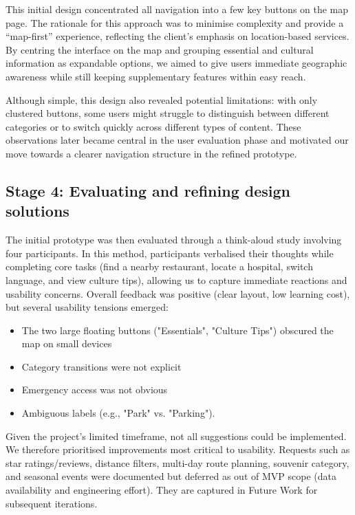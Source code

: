 This initial design concentrated all navigation into a few key buttons on the map page. The rationale for this approach was to minimise complexity and provide a “map-first” experience, reflecting the client’s emphasis on location-based services. By centring the interface on the map and grouping essential and cultural information as expandable options, we aimed to give users immediate geographic awareness while still keeping supplementary features within easy reach.  

Although simple, this design also revealed potential limitations: with only clustered buttons, some users might struggle to distinguish between different categories or to switch quickly across different types of content. These observations later became central in the user evaluation phase and motivated our move towards a clearer navigation structure in the refined prototype.

\subsection{Stage 4: Evaluating and refining design solutions}
The initial prototype was then evaluated through a think-aloud study involving four participants. In this method, participants verbalised their thoughts while completing core tasks (find a nearby restaurant, locate a hospital, switch language, and view culture tips), allowing us to capture immediate reactions and usability concerns. Overall feedback was positive (clear layout, low learning cost), but several usability tensions emerged: 
    \begin{itemize} \itemsep0pt \parskip0pt
        \item The two large floating buttons ("Essentials", "Culture Tips") obscured the map on small devices 
        \item Category transitions were not explicit
        \item Emergency access was not obvious
        \item Ambiguous labels (e.g., "Park" vs. "Parking").
    \end{itemize}

Given the project’s limited timeframe, not all suggestions could be implemented. We therefore prioritised improvements most critical to usability. Requests such as star ratings/reviews, distance filters, multi-day route planning, souvenir category, and seasonal events were documented but deferred as out of MVP scope (data availability and engineering effort). They are captured in Future Work for subsequent iterations.

